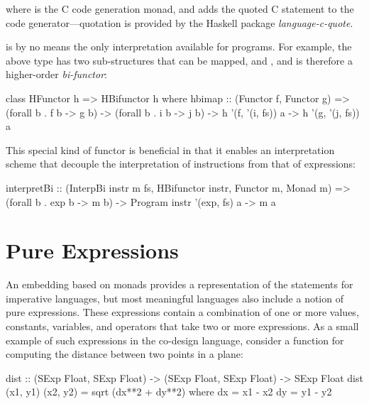 \documentclass[../paper.tex]{subfiles}
\begin{document}

\noindent where  is the C code generation monad, and  adds the quoted C statement to the code generator---quotation is provided by the Haskell package \textit{language-c-quote}.

 is by no means the only interpretation available for programs. For example, the above  type has two sub-structures that can be mapped,  and , and is therefore a higher-order \textit{bi-functor}:

\begin{code}
class HFunctor h => HBifunctor h where
  hbimap :: (Functor f, Functor g)
    => (forall b . f b -> g b)
    -> (forall b . i b -> j b)
    -> h '(f, '(i, fs)) a
    -> h '(g, '(j, fs)) a
\end{code}

\noindent This special kind of functor is beneficial in that it enables an interpretation scheme that decouple the interpretation of instructions from that of expressions:

\begin{code}
interpretBi :: (InterpBi instr m fs, HBifunctor instr, Functor m, Monad m)
  => (forall b . exp b -> m b) -> Program instr '(exp, fs) a -> m a
\end{code}

\section{Pure Expressions}
\label{expr}

An embedding based on monads provides a representation of the statements for imperative languages, but most meaningful languages also include a notion of pure expressions. These expressions contain a combination of one or more values, constants, variables, and operators that take two or more expressions. As a small example of such expressions in the co-design language, consider a function for computing the distance between two points in a plane:

\begin{code}
dist :: (SExp Float, SExp Float) -> (SExp Float, SExp Float) -> SExp Float
dist (x1, y1) (x2, y2) = sqrt (dx**2 + dy**2)
  where
    dx = x1 - x2
    dy = y1 - y2
\end{code}
\end{document}
